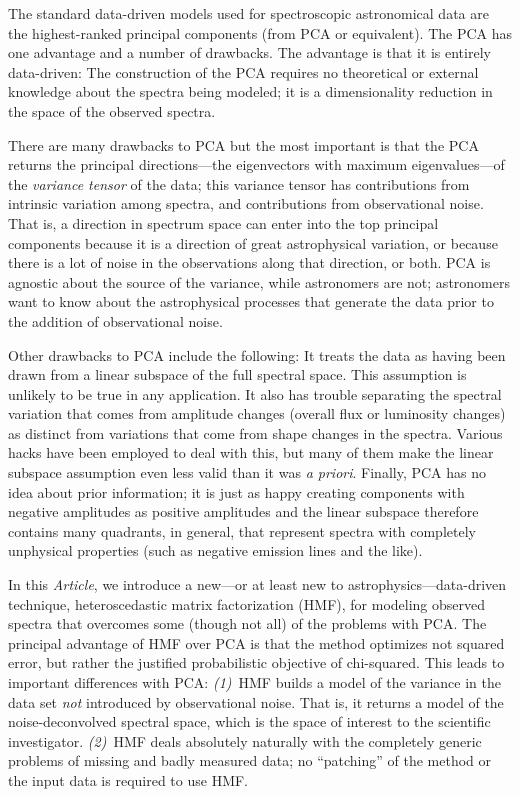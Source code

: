 \documentclass[12pt,preprint]{aastex}
\newcommand{\documentname}{\textsl{Article}}
\begin{document}
The standard data-driven models used for spectroscopic astronomical
data are the highest-ranked principal components (from PCA or
equivalent). The PCA has one advantage and a number of drawbacks.  The
advantage is that it is entirely data-driven: The construction of the
PCA requires no theoretical or external knowledge about the spectra
being modeled; it is a dimensionality reduction in the space of the
observed spectra.

There are many drawbacks to PCA but the most important is that the PCA
returns the principal directions---the eigenvectors with maximum
eigenvalues---of the \emph{variance tensor} of the data; this variance
tensor has contributions from intrinsic variation among spectra, and
contributions from observational noise.  That is, a direction in
spectrum space can enter into the top principal components because it
is a direction of great astrophysical variation, or because there is a
lot of noise in the observations along that direction, or both.  PCA
is agnostic about the source of the variance, while astronomers are
not; astronomers want to know about the astrophysical processes that
generate the data prior to the addition of observational noise.

Other drawbacks to PCA include the following: It treats the data as
having been drawn from a linear subspace of the full spectral
space. This assumption is unlikely to be true in any application.  It
also has trouble separating the spectral variation that comes from
amplitude changes (overall flux or luminosity changes) as distinct
from variations that come from shape changes in the spectra.  Various
hacks have been employed to deal with this, but many of them make the
linear subspace assumption even less valid than it was \textit{a
  priori}. Finally, PCA has no idea about prior information; it is
just as happy creating components with negative amplitudes as positive
amplitudes and the linear subspace therefore contains many quadrants,
in general, that represent spectra with completely unphysical
properties (such as negative emission lines and the like).

In this \documentname, we introduce a new---or at least new to
astrophysics---data-driven technique, heteroscedastic matrix
factorization (HMF), for modeling observed spectra that overcomes some
(though not all) of the problems with PCA.  The principal advantage of
HMF over PCA is that the method optimizes not squared error, but
rather the justified probabilistic objective of chi-squared.  This
leads to important differences with PCA: \textsl{(1)}~HMF builds a
model of the variance in the data set \emph{not} introduced by
observational noise.  That is, it returns a model of the
noise-deconvolved spectral space, which is the space of interest to
the scientific investigator.  \textsl{(2)}~HMF deals absolutely
naturally with the completely generic problems of missing and badly
measured data; no ``patching'' of the method or the input data is
required to use HMF.
\end{document}
